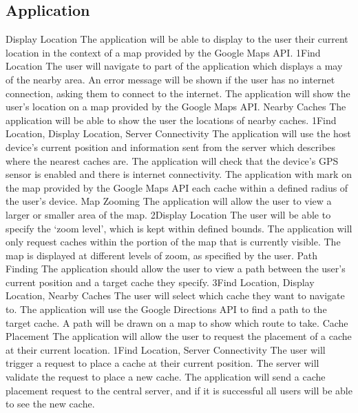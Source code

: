 	\subsection{Application}
		\funcreq
			{Display Location}
			{The application will be able to display to the user their current location in the context of a map provided by the Google Maps API.}
			{1}{Find Location}
			{The user will navigate to part of the application which displays a may of the nearby area.}
			{An error message will be shown if the user has no internet connection, asking them to connect to the internet.}
			{The application will show the user's location on a map provided by the Google Maps API.}
		\funcreq
			{Nearby Caches}
			{The application will be able to show the user the locations of nearby caches.}
			{1}{Find Location, Display Location, Server Connectivity}
			{The application will use the host device's current position and information sent from the server which describes where the nearest caches are.}
			{The application will check that the device's GPS sensor is enabled and there is internet connectivity.}
			{The application with mark on the map provided by the Google Maps API each cache within a defined radius of the user's device.}
		\funcreq
			{Map Zooming}
			{The application will allow the user to view a larger or smaller area of the map.}
			{2}{Display Location}
			{The user will be able to specify the `zoom level', which is kept within defined bounds.}
			{The application will only request caches within the portion of the map that is currently visible.}
			{The map is displayed at different levels of zoom, as specified by the user.}
		\funcreq
			{Path Finding}
			{The application should allow the user to view a path between the user's current position and a target cache they specify.}
			{3}{Find Location, Display Location, Nearby Caches}
			{The user will select which cache they want to navigate to.}
			{The application will use the Google Directions API to find a path to the target cache.}
			{A path will be drawn on a map to show which route to take.}
		\funcreq
			{Cache Placement}
			{The application will allow the user to request the placement of a cache at their current location.}
			{1}{Find Location, Server Connectivity}
			{The user will trigger a request to place a cache at their current position.}
			{The server will validate the request to place a new cache.}
			{The application will send a cache placement request to the central server, and if it is successful all users will be able to see the new cache.}

\renewcommand{\arraystretch}{1}

